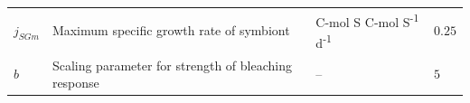\documentclass[]{elsarticle} %
\begin{document}
\begin{longtable}[]{@{}llll@{}}
\begin{minipage}[t]{0.09\columnwidth}\raggedright\strut
\(j_{SGm}\)\strut
\end{minipage} & \begin{minipage}[t]{0.46\columnwidth}\raggedright\strut
Maximum specific growth rate of symbiont\strut
\end{minipage} & \begin{minipage}[t]{0.24\columnwidth}\raggedright\strut
C-mol S C-mol S\textsuperscript{-1} d\textsuperscript{-1}\strut
\end{minipage} & \begin{minipage}[t]{0.09\columnwidth}\raggedright\strut
\(0.25\)\strut
\end{minipage}\tabularnewline
\begin{minipage}[t]{0.09\columnwidth}\raggedright\strut
\(b\)\strut
\end{minipage} & \begin{minipage}[t]{0.46\columnwidth}\raggedright\strut
Scaling parameter for strength of bleaching response\strut
\end{minipage} & \begin{minipage}[t]{0.24\columnwidth}\raggedright\strut
--\strut
\end{minipage} & \begin{minipage}[t]{0.09\columnwidth}\raggedright\strut
\(5\)\strut
\end{minipage}\tabularnewline
\bottomrule
\end{longtable}
\end{document}
